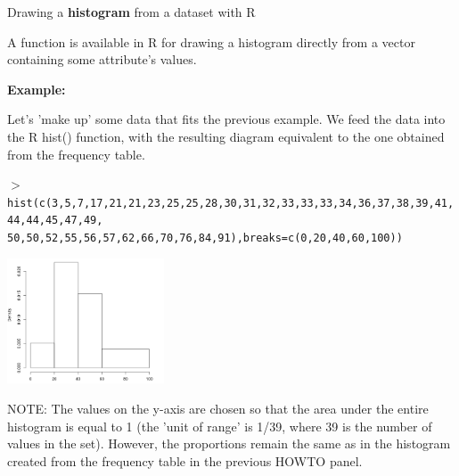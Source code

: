\vspace{-5ex}
\begin{howto}
  {Drawing a \textbf{histogram} from a dataset with R}
  {
    A function is available in R for drawing a histogram directly from a vector containing some attribute's values.

    \textbf{\color{darkgray} Example:}

    Let's 'make up' some data that fits the previous example. We feed the data into the R hist() function, with the resulting diagram equivalent to the one obtained from the frequency table.

    {\fontsize{14}{16}\texttt{$>$ hist(c(3,5,7,17,21,21,23,25,25,28,30,31,32,33,33,33,34,36,37,38,39,41,44,44,45,47,49,}
      \texttt{50,50,52,55,56,57,62,66,70,76,84,91),breaks=c(0,20,40,60,100))}}
    
    \begin{center} \includegraphics[width=0.35\textwidth]{histogram_r_example.png} \end{center}

    NOTE: The values on the y-axis are chosen so that the area under the entire histogram is equal to 1 (the 'unit of range' is 1/39, where 39 is the number of values in the set). However, the proportions remain the same as in the histogram created from the frequency table in the previous HOWTO panel.
  }
  {}{}
\end{howto}



